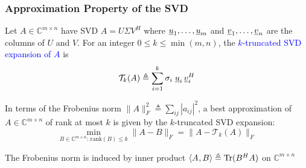 \documentclass[10pt,english,aspectratio=169]{beamer}
\begin{document}
\begin{frame} \frametitle{Approximation Property of the SVD}

\begin{definition}
Let $A \in \mathbb{C}^{m\times n}$ have SVD $A=U \Sigma V^H$ where $\underline{u}_1,\ldots,\underline{u}_m$ and $\underline{v}_1,\ldots,\underline{v}_n$ are the columns of $U$ and $V$.
For an integer $0\leq k\leq\min(m,n)$, the \textcolor{blue}{$k$-truncated SVD expansion of $A$} is \vspace{-2mm}
\[ \mathcal{T}_k (A) \triangleq \sum_{i=1}^k \sigma_i \; \underline{u}_i \, \underline{v}_i^H \]
\end{definition}

\vspace{2mm}

\begin{theorem}
In terms of the Frobenius norm $\| A \|_F^2 \triangleq \sum_{ij} |a_{ij}|^2$, a best approximation of $A \in \mathbb{C}^{m\times n}$ of rank at most $k$ is given by the $k$-truncated SVD expansion: \vspace{-2mm}
\[ \min_{B \in \mathbb{C}^{m\times n}: \, \text{rank}(B)\leq k} \| A - B \|_F  = \| A - \mathcal{T}_k (A) \|_F \]
\end{theorem}

\vspace{2mm}

The Frobenius norm is induced by inner product ${\langle  A  \mskip1mu ,  B  \rangle} \triangleq \text{Tr} (B^H A)$ on $\mathbb{C}^{m \times n}$  
\end{frame}
\end{document}
